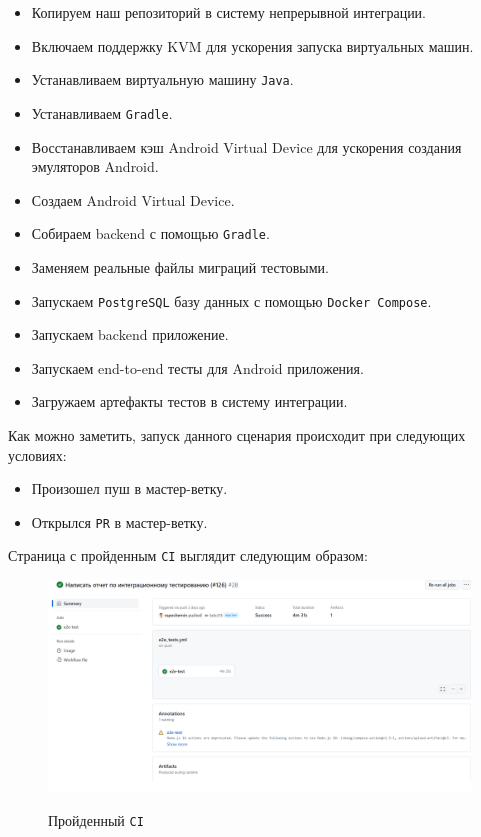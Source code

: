 \documentclass[a4paper, 14pt]{article}
\begin{document}
\begin{itemize}
    \item Копируем наш репозиторий в систему непрерывной интеграции.
    \item Включаем поддержку KVM для ускорения запуска виртуальных машин.
    \item Устанавливаем виртуальную машину \texttt{Java}.
    \item Устанавливаем \texttt{Gradle}.
    \item Восстанавливаем кэш Android Virtual Device для ускорения создания эмуляторов Android.
    \item Создаем Android Virtual Device.
    \item Собираем backend с помощью \texttt{Gradle}.
    \item Заменяем реальные файлы миграций тестовыми.
    \item Запускаем  \texttt{PostgreSQL} базу данных с помощью \texttt{Docker Compose}.
    \item Запускаем backend приложение.
    \item Запускаем end-to-end тесты для Android приложения.
    \item Загружаем артефакты тестов в систему интеграции.
\end{itemize}

Как можно заметить, запуск данного сценария происходит при следующих условиях:

\begin{itemize}
    \item Произошел пуш в мастер-ветку.
    \item Открылся \texttt{PR} в мастер-ветку.
\end{itemize}

Страница с пройденным \texttt{CI} выглядит следующим образом:

\begin{figure}[H]
    \centering
    \includegraphics[width=17cm]{resources/2.png}\\
    \caption{Пройденный \texttt{CI}}
\end{figure}
\end{document}
